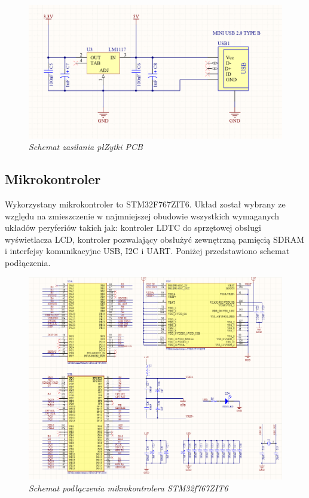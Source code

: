 \documentclass[eng,printmode]{mgr}
\begin{document}
\begin{figure}[!h]
    \centering
    \includegraphics[width=\textwidth]{schematics/power.png}
    \caption{\textit{\scriptsize Schemat zasilania płZytki PCB}}
\end{figure}
\subsection{Mikrokontroler}
Wykorzystany mikrokontroler to STM32F767ZIT6. Układ został wybrany ze względu na zmieszczenie w najmniejszej obudowie wszystkich wymaganych układów peryferiów takich jak: kontroler LDTC do sprzętowej obsługi wyświetlacza LCD, kontroler pozwalający obsłużyć zewnętrzną pamięcią SDRAM i interfejsy komunikacyjne USB, I2C i UART. Poniżej przedstawiono schemat podłączenia.

\begin{figure}[!h]
    \centering
    \includegraphics[height=\textwidth, angle=90]{schematics/uC.png}
    \caption{\textit{\scriptsize Schemat podłączenia mikrokontrolera STM32f767ZIT6}}
\end{figure}
\end{document}
